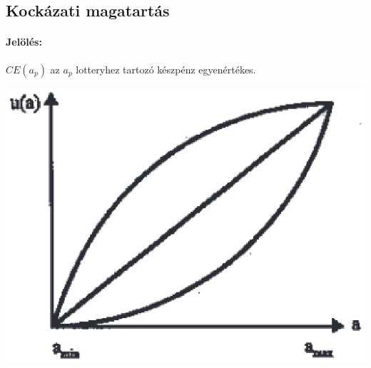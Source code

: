 \documentclass[a4paper,12pt]{article}
\begin{document}








\subsection{Kockázati magatartás}

\paragraph{Jelölés: } $CE(a_p)$ az $a_p$ lotteryhez tartozó készpénz egyenértékes. 

\begin{center}

\includegraphics[scale=0.7]{kockazat}
\\
\end{center}
\end{document}
